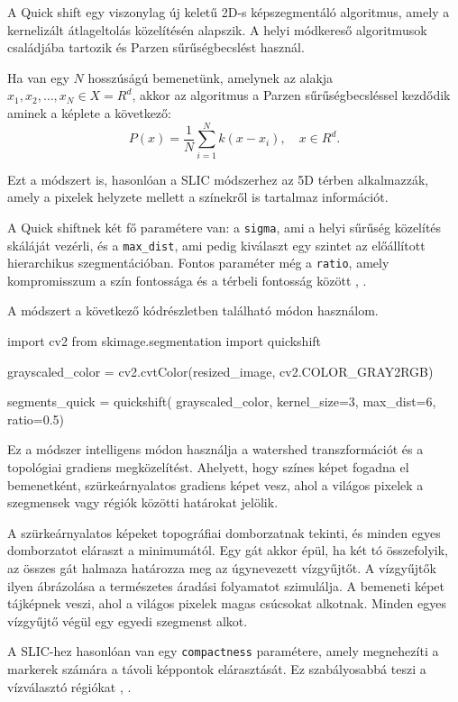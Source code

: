 A Quick shift egy viszonylag új keletű 2D-s képszegmentáló algoritmus, amely a kernelizált átlageltolás közelítésén alapszik. A helyi módkereső algoritmusok családjába tartozik és Parzen sűrűségbecslést használ.

Ha van egy $N$ hosszúságú bemenetünk, amelynek az alakja $x_1, x_2, \dots, x_N \in X = R^d$, akkor az algoritmus a Parzen sűrűségbecsléssel kezdődik aminek a képlete a következő:
\[
P(x) =\frac{1}{N} \sum_{i=1}^{N} k(x-x_i), \quad x \in R^d.
\]

Ezt a módszert is, hasonlóan a SLIC módszerhez az 5D térben alkalmazzák, amely a pixelek helyzete mellett a színekről is tartalmaz információt.

A Quick shiftnek két fő paramétere van: a \texttt{sigma}, ami a helyi sűrűség közelítés skáláját vezérli, és a \texttt{max\_dist}, ami pedig kiválaszt egy szintet az előállított hierarchikus szegmentációban. Fontos paraméter még a \texttt{ratio}, amely kompromisszum a szín fontossága és a térbeli fontosság között \cite{superpixel}, \cite{superpixel_example}.

A módszert a következő kódrészletben található módon használom.
\begin{python}
import cv2
from skimage.segmentation import quickshift

grayscaled_color = cv2.cvtColor(resized_image, cv2.COLOR_GRAY2RGB)

segments_quick = quickshift(
    grayscaled_color,
    kernel_size=3,
    max_dist=6,
    ratio=0.5)
\end{python}


Ez a módszer intelligens módon használja a watershed transzformációt és a topológiai gradiens megközelítést. Ahelyett, hogy színes képet fogadna el bemenetként, szürkeárnyalatos gradiens képet vesz, ahol a világos pixelek a szegmensek vagy régiók közötti határokat jelölik.

A szürkeárnyalatos képeket topográfiai domborzatnak tekinti, és minden egyes domborzatot eláraszt a minimumától. Egy gát akkor épül, ha két tó összefolyik, az összes gát halmaza határozza meg az úgynevezett vízgyűjtőt. A vízgyűjtők ilyen ábrázolása a természetes áradási folyamatot szimulálja. A bemeneti képet tájképnek veszi, ahol a világos pixelek magas csúcsokat alkotnak. Minden egyes vízgyűjtő végül egy egyedi szegmenst alkot.

A SLIC-hez hasonlóan van egy \texttt{compactness} paramétere, amely megnehezíti a markerek számára a távoli képpontok elárasztását. Ez szabályosabbá teszi a vízválasztó régiókat \cite{superpixel}, \cite{superpixel_example}.

